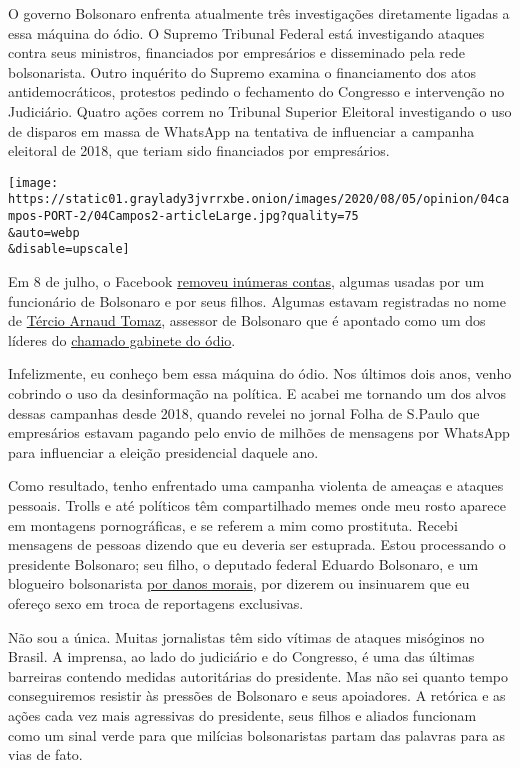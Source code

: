O governo Bolsonaro enfrenta atualmente três investigações diretamente
ligadas a essa máquina do ódio. O Supremo Tribunal Federal está
investigando ataques contra seus ministros, financiados por empresários
e disseminado pela rede bolsonarista. Outro inquérito do Supremo examina
o financiamento dos atos antidemocráticos, protestos pedindo o
fechamento do Congresso e intervenção no Judiciário. Quatro ações correm
no Tribunal Superior Eleitoral investigando o uso de disparos em massa
de WhatsApp na tentativa de influenciar a campanha eleitoral de 2018,
que teriam sido financiados por empresários.

\texttt{[image: https://static01.graylady3jvrrxbe.onion/images/2020/08/05/opinion/04campos-PORT-2/04Campos2-articleLarge.jpg?quality=75\\\&auto=webp\\\&disable=upscale]}

Em 8 de julho, o Facebook
\href{https://www1.folha.uol.com.br/poder/2020/07/facebook-remove-contas-falsas-ligadas-aos-bolsonaros-e-ao-gabinete-da-presidencia.shtml}{removeu
inúmeras contas}, algumas usadas por um funcionário de Bolsonaro e por
seus filhos. Algumas estavam registradas no nome de
\href{https://elpais.com/internacional/2020-07-10/facebook-rompe-la-oficina-del-odio-una-red-de-88-cuentas-de-apoyo-a-jair-bolsonaro.html}{Tércio
Arnaud Tomaz}, assessor de Bolsonaro que é apontado como um dos líderes
do \href{https://apnews.com/0c58cccec2004bf250c8dab38172cbc9}{chamado
gabinete do ódio}.

Infelizmente, eu conheço bem essa máquina do ódio. Nos últimos dois
anos, venho cobrindo o uso da desinformação na política. E acabei me
tornando um dos alvos dessas campanhas desde 2018, quando revelei no
jornal Folha de S.Paulo que empresários estavam pagando pelo envio de
milhões de mensagens por WhatsApp para influenciar a eleição
presidencial daquele ano.

Como resultado, tenho enfrentado uma campanha violenta de ameaças e
ataques pessoais. Trolls e até políticos têm compartilhado memes onde
meu rosto aparece em montagens pornográficas, e se referem a mim como
prostituta. Recebi mensagens de pessoas dizendo que eu deveria ser
estuprada. Estou processando o presidente Bolsonaro; seu filho, o
deputado federal Eduardo Bolsonaro, e um blogueiro bolsonarista
\href{http://www.fundamedios.us/incidentes/patriciacampos-demanda-jairbolsonaro-ofensas-periodista/}{por
danos morais}, por dizerem ou insinuarem que eu ofereço sexo em troca de
reportagens exclusivas.

Não sou a única. Muitas jornalistas têm sido vítimas de ataques
misóginos no Brasil. A imprensa, ao lado do judiciário e do Congresso, é
uma das últimas barreiras contendo medidas autoritárias do presidente.
Mas não sei quanto tempo conseguiremos resistir às pressões de Bolsonaro
e seus apoiadores. A retórica e as ações cada vez mais agressivas do
presidente, seus filhos e aliados funcionam como um sinal verde para que
milícias bolsonaristas partam das palavras para as vias de fato.

